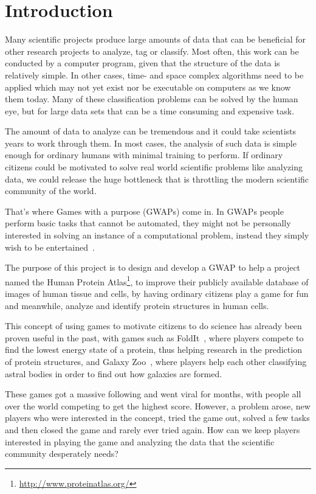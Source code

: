 \section{Introduction}\label{sec:introduction}

Many scientific projects produce large amounts of data that can be beneficial for other research projects to analyze, tag or classify. Most often, this work can be conducted by a computer program, given that the structure of the data is relatively simple. In other cases, time- and space complex algorithms need to be applied which may not yet exist nor be executable on computers as we know them today. Many of these classification problems can be solved by the human eye, but for large data sets that can be a time consuming and expensive task.

The amount of data to analyze can be tremendous and it could take scientists years to work through them. In most cases, the analysis of such data is simple enough for ordinary humans with minimal training to perform. If ordinary citizens could be motivated to solve real world scientific problems like analyzing data, we could release the huge bottleneck that is throttling the modern scientific community of the world.

That's where Games with a purpose (GWAPs) come in. In GWAPs people perform basic tasks that cannot be automated, they might not be personally interested in solving an instance of a computational problem, instead they simply wish to be entertained~\cite{GWAP}.

The purpose of this project is to design and develop a GWAP to help a project named the Human Protein Atlas\footnote{\url{http://www.proteinatlas.org/}}, to improve their publicly available database of images of human tissue and cells, by having ordinary citizens play a game for fun and meanwhile, analyze and identify protein structures in human cells.

This concept of using games to motivate citizens to do science has already been proven useful in the past, with games such as FoldIt~\cite{foldit}, where players compete to find the lowest energy state of a protein, thus helping research in the prediction of protein structures, and Galaxy Zoo~\cite{galaxyzoo}, where players help each other classifying astral bodies in order to find out how galaxies are formed.

These games got a massive following and went viral for months, with people all over the world competing to get the highest score. However, a problem arose, new players who were interested in the concept, tried the game out, solved a few tasks and then closed the game and rarely ever tried again. How can we keep players interested in playing the game and analyzing the data that the scientific community desperately needs?

